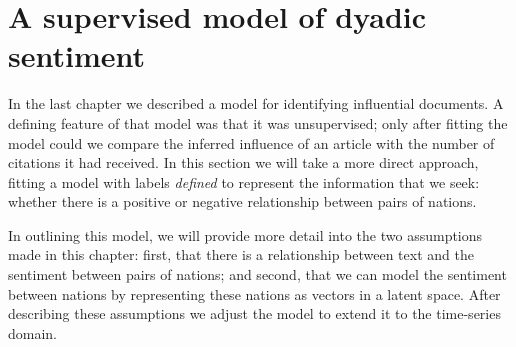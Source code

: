 \section{A supervised model of dyadic sentiment}

\label{section:foreign_relations_supervised_model}

In the last chapter we described a model for identifying influential
documents.  A defining feature of that model was that it was
unsupervised; only after fitting the model could we compare the
inferred influence of an article with the number of citations it had
received.  In this section we will take a more direct approach,
fitting a model with labels \emph{defined} to represent the
information that we seek: whether there is a positive or negative
relationship between pairs of nations.

In outlining this model, we will provide more detail into the two
assumptions made in this chapter: first, that there is a relationship
between text and the sentiment between pairs of nations; and second,
that we can model the sentiment between nations by representing
these nations as vectors in a latent space.  After describing these
assumptions we adjust the model to extend it to the time-series
domain.

